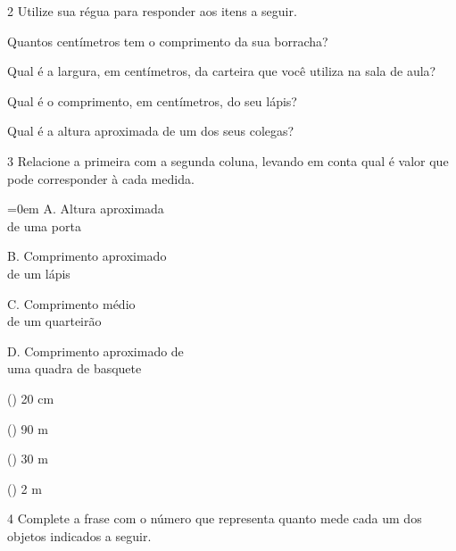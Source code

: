 \num{2} Utilize sua régua para responder aos itens a seguir.

\begin{escolha}
\item Quantos centímetros tem o comprimento da sua borracha?

\item Qual é a largura, em centímetros, da carteira que você utiliza na sala de aula?

\item Qual é o comprimento, em centímetros, do seu lápis?

\item Qual é a altura aproximada de um dos seus colegas?
\end{escolha}

\num{3} Relacione a primeira com a segunda coluna, levando em conta qual é valor que 
pode corresponder à cada medida.


\begin{multicols}{2}\parindent=0em
A. Altura aproximada\\
de uma porta\bigskip

B. Comprimento aproximado\\
de um lápis\bigskip

C. Comprimento médio\\
de um quarteirão\bigskip

D. Comprimento aproximado de\\
uma quadra de basquete

\columnbreak

(\hspace{2em}) 20 cm\bigskip

(\hspace{2em}) 90 m\bigskip

(\hspace{2em}) 30 m\bigskip

(\hspace{2em}) 2 m
\end{multicols}



\pagebreak

\num{4} Complete a frase com o número que representa quanto mede cada um dos
objetos indicados a seguir.

